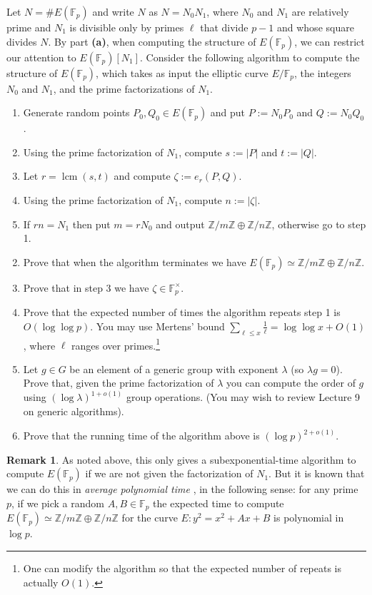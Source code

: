 \documentclass[11pt]{article}
\newcommand{\Fp}{\mathbb{F}_p}
\newcommand{\Z}{\mathbb{Z}}
\newcommand{\lcm}{\operatorname{lcm}}
\theoremstyle{definition}
\newtheorem*{remark}{Remark}
\begin{document}
Let $N=\#E(\Fp)$ and write $N$ as $N=N_0N_1$, where $N_0$ and $N_1$ are relatively prime and $N_1$ is divisible only by primes $\ell$ that divide $p-1$ and whose square divides $N$.
By part \textbf{(a)}, when computing the structure of $E(\Fp)$, we can restrict our attention to $E(\Fp)[N_1]$.
Consider the following algorithm to compute the structure of $E(\Fp)$, which takes as input the elliptic curve $E/\Fp$, the integers $N_0$ and $N_1$, and the prime factorizations of $N_1$.

\begin{enumerate}
\setlength{\itemsep}{0pt}
\item Generate random points $P_0,Q_0\in E(\Fp)$ and put $P:=N_0P_0$ and $Q:=N_0Q_0$.
\item Using the prime factorization of $N_1$, compute $s:=|P|$ and $t:=|Q|$.
\item Let $r=\lcm(s,t)$ and compute $\zeta:=e_r(P,Q)$.
\item Using the prime factorization of $N_1$, compute $n:=|\zeta|$.
\item If $rn = N_1$ then put $m=rN_0$ and output $\Z/m\Z\oplus\Z/n\Z$, otherwise go to step 1.
\end{enumerate}

\begin{enumerate}[{\bf(a)}]
\setcounter{enumi}{1}
\item Prove that when the algorithm terminates we have $E(\Fp)\simeq \Z/m\Z\oplus \Z/n\Z$.
\item Prove that in step 3 we have $\zeta\in\Fp^\times$.
\item Prove that the expected number of times the algorithm repeats step 1 is  $O(\log \log p)$.
You may use Mertens' bound $\sum_{\ell\le x} \frac{1}{\ell} =\log\log x+O(1)$, where $\ell$ ranges over primes.\footnote{One can modify the algorithm so that the expected number of repeats is actually $O(1)$.}
\item Let $g\in G$ be an element of a generic group with exponent $\lambda$ (so $\lambda g =0$).
Prove that, given the prime factorization of $\lambda$ you can compute the order of $g$ using $(\log\lambda)^{1+o(1)}$ group operations.
(You may wish to review Lecture 9 on generic algorithms).
\item Prove that the running time of the algorithm above is $(\log p)^{2+o(1)}$.
\end{enumerate}

\begin{remark}
As noted above, this only gives a subexponential-time algorithm to compute $E(\Fp)$ if we are not given the factorization of $N_1$.
But it is known that we can do this in \emph{average polynomial time} \cite{FPS}, in the following sense: for any prime $p$, if we pick a random $A,B\in \Fp$ the expected time to compute $E(\Fp)\simeq \Z/m\Z\oplus\Z/n\Z$ for the curve $E\colon y^2=x^2+Ax+B$ is polynomial in $\log p$.
\end{remark}
\end{document}
